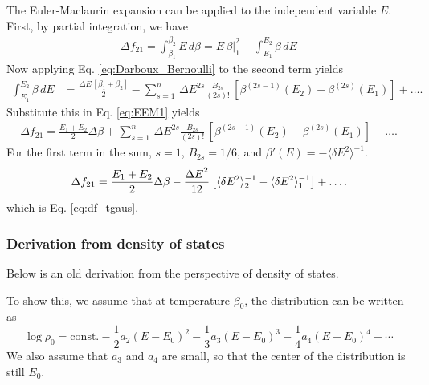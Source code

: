 \documentclass[aip,jcp,preprint,notitlepage, superscriptaddress]{revtex4-1}
\begin{document}
The Euler-Maclaurin expansion can be applied to
the independent variable $E$.
%
First, by partial integration, we have
%
\begin{align}
\Delta f_{21}
=
\int_{\beta_1}^{\beta_2} E \, d\beta
=
E \, \beta \Big|_1^2
-
\int_{E_1}^{E_2} \beta \, dE
\label{eq:EEM1}
\end{align}
%
Now applying
Eq. \eqref{eq:Darboux_Bernoulli}
to the second term
yields
\begin{align}
\int_{E_1}^{E_2}
  \beta \, dE
&=
\frac{ \Delta E \, \left[
    \beta_1 + \beta_2
  \right]
} {2 }
-
\sum_{s = 1}^{n}
\, {\Delta E}^{2 s}
\frac{ B_{2 s} }{ (2 s)! }
\, \left[\beta^{(2 s - 1)}(E_2) - \beta^{(2 s)}(E_1)\right]
  + \dots.
\end{align}
%
Substitute this in Eq. \eqref{eq:EEM1}
yields
\begin{align}
\Delta f_{21}
=
\frac{
    E_1 + E_2
} {2 }
\Delta \beta
+
\sum_{s = 1}^{n}
\, {\Delta E}^{2 s}
\frac{ B_{2 s} }{ (2 s)! }
\, \left[\beta^{(2 s - 1)}(E_2) - \beta^{(2 s)}(E_1)\right]
  + \dots.
\end{align}
%
For the first term in the sum,
$s = 1$, $B_{2s} = 1/6$,
and $\beta'(E) = -\langle \delta E^2 \rangle^{-1}$.
%
\begin{align}
\Delta f_{21}
=
\frac{
    E_1 + E_2
} {2 }
\Delta \beta
-
\frac{ {\Delta E}^{2} }{ 12 }
\left[
  \langle \delta E^2 \rangle_2^{-1}
-
  \langle \delta E^2 \rangle_1^{-1}
\right]
+ \dots.
\notag
\end{align}
which is Eq. \eqref{eq:df_tgaus}.




\subsubsection{Derivation from density of states}



Below is an old derivation from
the perspective of density of states.


To show this,
we assume that at temperature $\beta_0$,
the distribution can be written as
%
\begin{equation}
\log \rho_0
=
\mathrm{const.}
-\frac{1}{2} a_2 (E - E_0)^2
-\frac{1}{3} a_3 (E - E_0)^3
-\frac{1}{4} a_4 (E - E_0)^4
-\cdots
\end{equation}
%
We also assume that
$a_3$ and $a_4$ are small,
so that the center of the distribution is still $E_0$.
\end{document}
